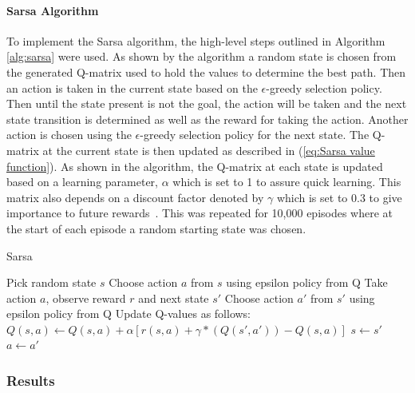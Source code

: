 \documentclass[12pt,american]{report}
\begin{document}
\paragraph{Sarsa Algorithm}
To implement the Sarsa algorithm, the high-level steps outlined in Algorithm \ref{alg:sarsa} were used.  As shown by the algorithm a random state is chosen from the generated Q-matrix used to hold the values to determine the best path.  Then an action is taken in the current state based on the \begin{math}\epsilon\end{math}-greedy selection policy.  Then until the state present is not the goal, the action will be taken and the next state transition is determined as well as the reward for taking the action. Another action is chosen using the \begin{math}\epsilon\end{math}-greedy selection policy for the next state. The Q-matrix at the current state is then updated as described in (\ref{eq:Sarsa value function}). As shown in the algorithm, the Q-matrix at each state is updated based on a learning parameter, \begin{math}\alpha\end{math} which is set to 1 to assure quick learning. This matrix also depends on a discount factor denoted by \begin{math}\gamma\end{math} which is set to 0.3 to give importance to future rewards~\cite{Eden}. This was repeated for 10,000 episodes where at the start of each episode a random starting state was chosen.



\begin{algorithm}
\caption{Sarsa~\cite{Eden}}
\label{alg:sarsa}
\begin{algorithmic} 
\State Pick random state $s$
\State Choose action $a$ from $s$ using epsilon policy from Q
\State Take action $a$, observe reward $r$ and next state $s'$
\State Choose action $a'$ from $s'$ using epsilon policy from Q
\State Update Q-values as follows:
\State $Q(s,a) \leftarrow Q(s,a) + \alpha [r(s,a)+ \gamma*(Q(s',a')) - Q(s,a)] $
\State $s \leftarrow s'$
\State $a \leftarrow a'$
\EndWhile
\EndFor
\end{algorithmic}
\end{algorithm}


\subsubsection{Results}
\end{document}
